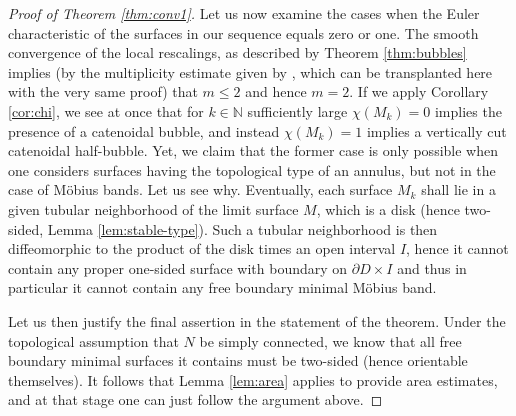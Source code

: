 \documentclass[JEP,XML,SOM,Unicode]{cedram}
\newcounter{cas}
\theoremstyle{definition}
\begin{document}
\begin{proof}[Proof of Theorem \ref{thm:conv1}]
Let us now examine the cases when the Euler characteristic of the surfaces in our sequence equals zero or one. The smooth convergence of the local rescalings, as described by Theorem \ref{thm:bubbles} implies (by the multiplicity estimate given by \cite[Prop.\,13]{ABCS18}, which can be transplanted here with the very same proof) that $m\leq 2$ and hence $m=2$.
If we apply Corollary \ref{cor:chi}, we see at once that for $k\in\mathbb{N}$ sufficiently large $\chi(M_k)=0$ implies the presence of a catenoidal bubble, and instead $\chi(M_k)=1$ implies a vertically cut catenoidal half-bubble. Yet, we claim that the former case is only possible when one considers surfaces having the topological type of an annulus, but not in the case of Möbius bands. Let us see why.
Eventually, each surface $M_k$ shall lie in a given tubular neighborhood of the limit surface $M$, which is a disk (hence two-sided, \cf Lemma \ref{lem:stable-type}). Such a tubular neighborhood is then diffeomorphic to the product of the disk times an open interval $I$, hence it cannot contain any proper one-sided surface with boundary on $\partial D\times I$ and thus in particular it cannot contain any free boundary minimal Möbius band.

Let us then justify the final assertion in the statement of the theorem. Under the topological assumption that $N$ be simply connected, we know that all free boundary minimal surfaces it contains must be two-sided (hence orientable themselves). It follows that Lemma \ref{lem:area} applies to provide area estimates, and at that stage one can just follow the argument above.
\end{proof}
\end{document}
